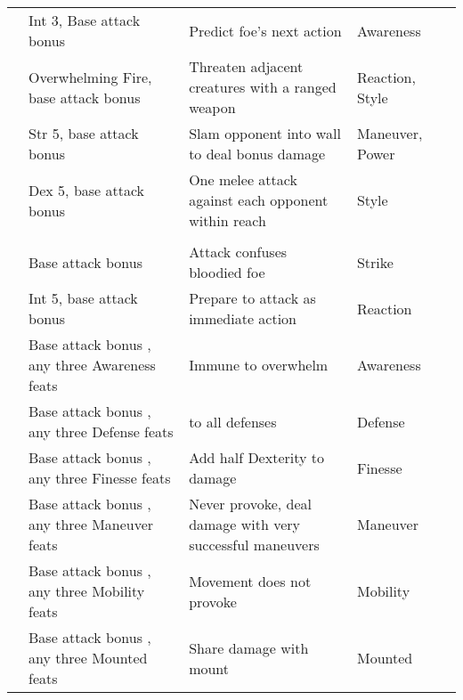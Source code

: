 {\begin{longtabu}{>{\lcol}p{10em} >{\lcol}p{15em} >{\lcol}X >{\lcol}p{6em} >{\lcol}p{3em}}
         & Int 3, Base attack bonus  & Predict foe's next action & Awareness &  \\
         & Overwhelming Fire, base attack bonus  & Threaten adjacent creatures with a ranged weapon & Reaction, Style &  \\
         & Str 5, base attack bonus  & Slam opponent into wall to deal bonus damage & Maneuver, Power &  \\
         & Dex 5, base attack bonus  & One melee attack against each opponent within reach & Style &  \\

        \midrule
         &  &  &  &  \\
         & Base attack bonus  & Attack confuses bloodied foe & Strike &  \\
         & Int 5, base attack bonus  & Prepare to attack as immediate action & Reaction &  \\
         & Base attack bonus , any three Awareness feats & Immune to overwhelm & Awareness &  \\
         & Base attack bonus , any three Defense feats &  to all defenses & Defense &  \\
         & Base attack bonus , any three Finesse feats & Add half Dexterity to damage & Finesse &  \\
         & Base attack bonus , any three Maneuver feats & Never provoke, deal damage with very successful maneuvers & Maneuver &  \\
         & Base attack bonus , any three Mobility feats & Movement does not provoke & Mobility&  \\
         & Base attack bonus , any three Mounted feats & Share damage with mount & Mounted&  \\

\end{longtabu}}

